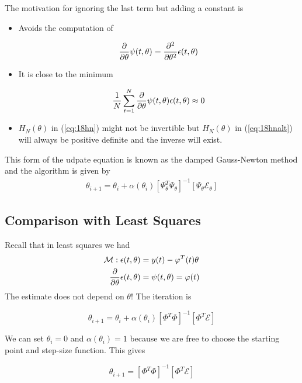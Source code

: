 The motivation for ignoring the last term but adding a constant is
\begin{itemize}
\item Avoids the computation of

  \begin{equation*}
\frac{\partial}{\partial\theta}\psi(t,\theta) = \frac{\partial^2}{\partial\theta^2}\epsilon(t,\theta)
  \end{equation*}

\item It is close to the minimum

  \begin{equation*}
\frac{1}{N}\sum_{t=1}^N\frac{\partial}{\partial\theta}\psi(t,\theta)\epsilon(t,\theta) \approx 0
  \end{equation*}

\item $H_N(\theta)$ in (\ref{eq:18hn}) might not be invertible but $H_N(\theta)$ in (\ref{eq:18hnalt}) will always be positive definite and the inverse will exist.
\end{itemize}
This form of the udpate equation is known as the damped Gauss-Newton method and the algorithm is given by
\begin{align*}
\boxed{\theta_{i+1} = \theta_i + \alpha(\theta_i){\left[\Psi_\theta^T\Psi_\theta\right]}^{-1} \left[\Psi_\theta\mathcal{E}_\theta\right]}
\end{align*}

\subsection{Comparison with Least Squares}
Recall that in least squares we had
\begin{align*}
\mathcal{M}: \epsilon(t,\theta) &= y(t) - \varphi^T(t)\theta \\
\frac{\partial}{\partial\theta}\epsilon(t,\theta) &= \psi(t,\theta) = \varphi(t)
\end{align*}
The estimate does not depend on $\theta$! The iteration is

\begin{equation*}
\theta_{i+1} = \theta_i + \alpha(\theta_i){\left[\Phi^T\Phi\right]}^{-1}\left[\Phi^T\mathcal{E}\right]
\end{equation*}

We can set $\theta_i=0$ and $\alpha(\theta_i)=1$ because we are free to choose the starting point and step-size function.
This gives

\begin{equation*}
\theta_{i+1} = {\left[\Phi^T\Phi\right]}^{-1}\left[\Phi^T\mathcal{E}\right]
\end{equation*}

